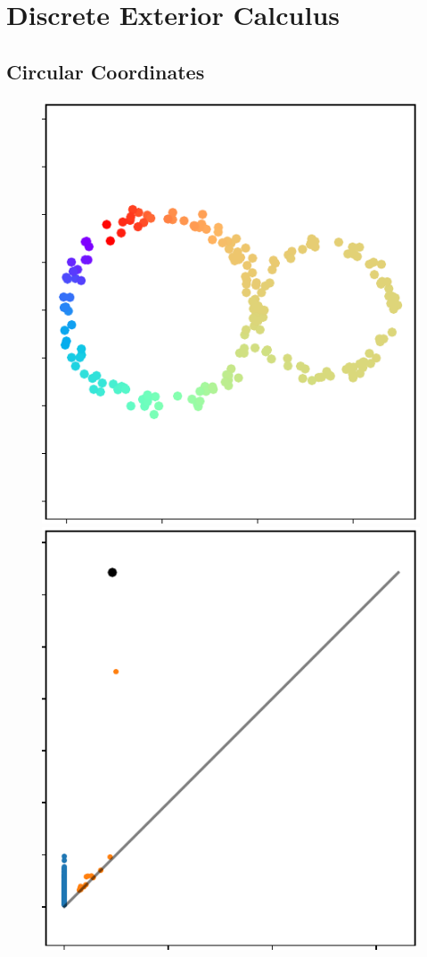 \section{Discrete Exterior Calculus} %
\label{sec:dec}

\subsection{Circular Coordinates}

\begin{figure}[htbp]
\centering
  \includegraphics[scale=0.8]{figures/circular_coords1.pdf}
  \includegraphics[scale=0.8]{figures/circular_dgm1.pdf}\\

\end{figure}
